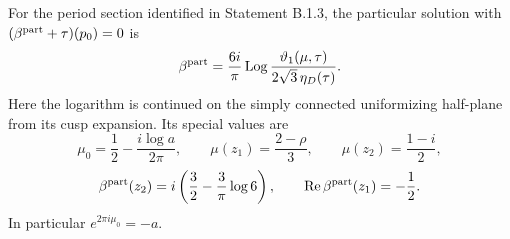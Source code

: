 \begin{proposition}[C.1.1; Proved]\label{st:C.1.1}
For the period section identified in Statement B.1.3, the particular solution
with \((\beta^{\rm part}+\tau)(p_0)=0\) is
\begin{equation}\label{eq:cd-beta}
 \beta^{\rm part}=\frac{6i}{\pi}\operatorname{Log}
 \frac{\vartheta_1(\mu,\tau)}{2\sqrt3\,\eta_D(\tau)}.
\end{equation}
Here the logarithm is continued on the simply connected uniformizing
half-plane from its cusp expansion. Its special values are
\[
 \mu_0=\frac12-\frac{i\log a}{2\pi},\qquad
 \mu(z_1)=\frac{2-\rho}{3},\qquad \mu(z_2)=\frac{1-i}{2},
\]
\[
 \beta^{\rm part}(z_2)=i\left(\frac32-\frac3\pi\log6\right),
 \qquad \operatorname{Re}\beta^{\rm part}(z_1)=-\frac12.
\]
In particular \(e^{2\pi i\mu_0}=-a\).
\end{proposition}
